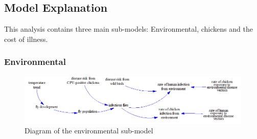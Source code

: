 \subsection{Model Explanation}
   
This analysis contains three main sub-models: Environmental, chickens and the cost of illness. 

\subsubsection*{Environmental}

\begin{figure}[!ht]
	\centering
	\includegraphics[width=1\textwidth]{images/environmental_submodel2.png}
	\caption{Diagram of the environmental sub-model}
	\label{fig:environmental_submodel}
\end{figure}


